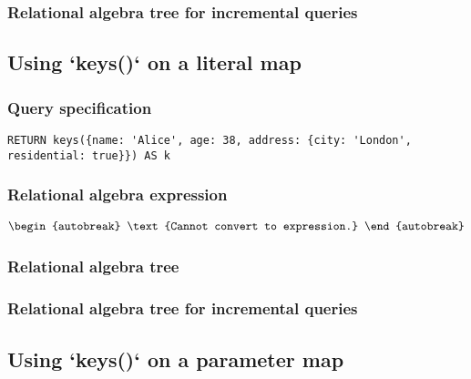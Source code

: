 \subsubsection*{Relational algebra tree for incremental queries}


\subsection{Using `keys()` on a literal map}

\subsubsection*{Query specification}

\begin{lstlisting}
RETURN keys({name: 'Alice', age: 38, address: {city: 'London', residential: true}}) AS k
\end{lstlisting}

\subsubsection*{Relational algebra expression}

\begin{align*}
\begin{autobreak}
\text{Cannot convert to expression.}
\end{autobreak}
\end{align*}

\subsubsection*{Relational algebra tree}


\subsubsection*{Relational algebra tree for incremental queries}


\subsection{Using `keys()` on a parameter map}

